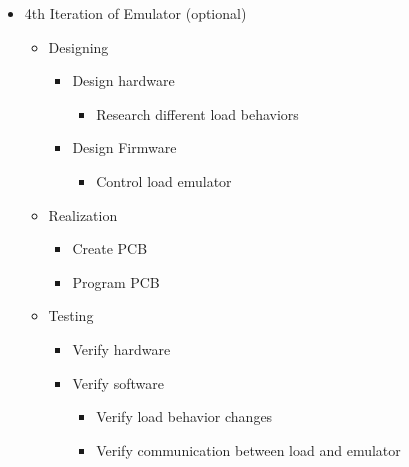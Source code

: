 \begin{itemize}
    \item 4th Iteration of Emulator (optional)
    \begin{itemize}
        \item Designing 
        \begin{itemize}
            \item Design hardware
            \begin{itemize}
                \item Research different load behaviors 
            \end{itemize}
            \item Design Firmware
            \begin{itemize}
                \item Control load emulator
            \end{itemize}
        \end{itemize}
        \item Realization
        \begin{itemize}
        \item Create PCB
        \item Program PCB
        \end{itemize}
        \item Testing
        \begin{itemize}
            \item Verify hardware
            \item Verify software 
            \begin{itemize}
                \item Verify load behavior changes
                \item Verify communication between load and emulator
                \end{itemize}
        \end{itemize}
    \end{itemize}



\end{itemize}
